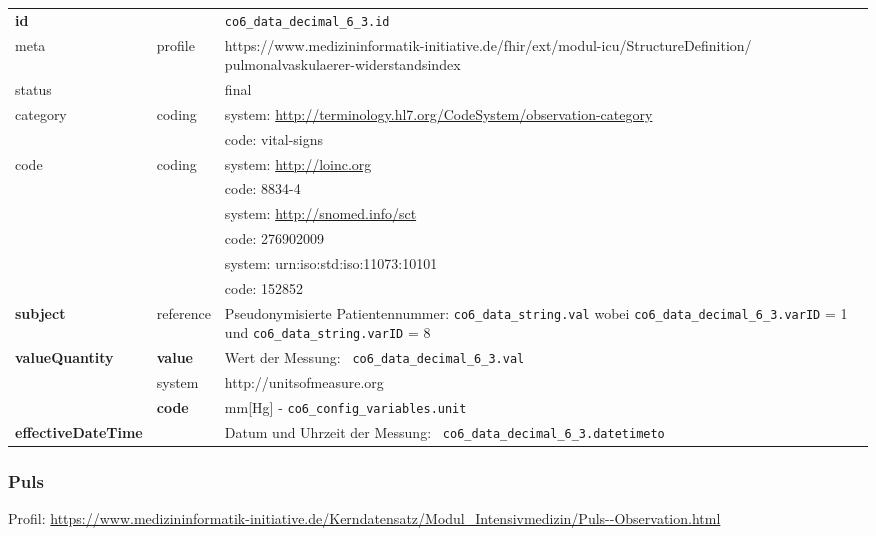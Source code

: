\begin{longtable}{|l|l|p{7.5cm}|}
	\hline
	\rowcolor{lightgray} \multicolumn{3}{|l|}{Data Mapping (inhaltlich)} \\ \hline
	\textbf{id} &  & \texttt{co6\_data\_decimal\_6\_3.id} \\ \hline
	meta & profile & https://www.medizininformatik-initiative.de/fhir/ext/modul-icu/StructureDefinition/
	pulmonalvaskulaerer-widerstandsindex \\ \hline 
	status &  & final   \\ \hline 
	category & coding & system: \url{http://terminology.hl7.org/CodeSystem/observation-category} \\
	\cline{3-3}
	& & code: vital-signs\\ \hline
	code & coding & system: \url{http://loinc.org} \\ 
	\cline{3-3} 
	&  & code: 8834-4 \\ 
	\cline{3-3} 
	&  & system: \url{http://snomed.info/sct} \\ 
	\cline{3-3}
	&  & code: 276902009 \\ 
	\cline{3-3} 
	&  & system: urn:iso:std:iso:11073:10101 \\ 
	\cline{3-3}
	&  & code: 152852 \\ \hline
	\textbf{subject} & reference & Pseudonymisierte Patientennummer: \texttt{co6\_data\_string.val} wobei \texttt{co6\_data\_decimal\_6\_3.varID} = 1 und \texttt{co6\_data\_string.varID} = 8 \\ \hline
	\textbf{valueQuantity}  & \textbf{value} & Wert der Messung: \texttt{
		co6\_data\_decimal\_6\_3.val} \\
	\cline{2-3}
	& system & http://unitsofmeasure.org \\
	\cline{2-3}
	& \textbf{code} & mm[Hg] - \texttt{co6\_config\_variables.unit} \\ \hline
	\textbf{effectiveDateTime}  & & Datum und Uhrzeit der Messung: \texttt{
		co6\_data\_decimal\_6\_3.datetimeto} \\
	\hline
\end{longtable}

\subsubsection{Puls}

Profil: \url{https://www.medizininformatik-initiative.de/Kerndatensatz/Modul_Intensivmedizin/Puls--Observation.html}

\clearpage

